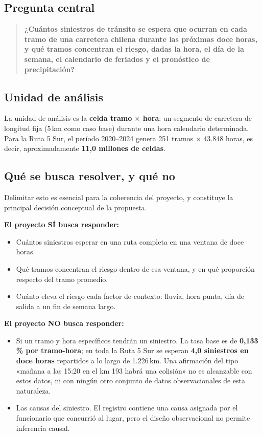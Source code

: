 \documentclass[11pt,a4paper]{article}
\begin{document}
\subsection{Pregunta central}

\begin{quote}
\textbf{¿Cuántos siniestros de tránsito se espera que ocurran en cada tramo de
una carretera chilena durante las próximas doce horas, y qué tramos concentran
el riesgo, dadas la hora, el día de la semana, el calendario de feriados y el
pronóstico de precipitación?}
\end{quote}

\subsection{Unidad de análisis}

La unidad de análisis es la \textbf{celda tramo $\times$ hora}: un segmento de
carretera de longitud fija (5\,km como caso base) durante una hora calendario
determinada. Para la Ruta 5 Sur, el período 2020--2024 genera 251 tramos
$\times$ 43.848 horas, es decir, aproximadamente \textbf{11,0 millones de
celdas}.

\subsection{Qué se busca resolver, y qué no}

Delimitar esto es esencial para la coherencia del proyecto, y constituye la
principal decisión conceptual de la propuesta.

\medskip
\noindent\textbf{El proyecto SÍ busca responder:}
\begin{itemize}
  \item Cuántos siniestros esperar en una ruta completa en una ventana de doce
  horas.
  \item Qué tramos concentran el riesgo dentro de esa ventana, y en qué
  proporción respecto del tramo promedio.
  \item Cuánto eleva el riesgo cada factor de contexto: lluvia, hora punta, día
  de salida a un fin de semana largo.
\end{itemize}

\medskip
\noindent\textbf{El proyecto NO busca responder:}
\begin{itemize}
  \item Si un tramo y hora específicos tendrán un siniestro. La tasa base es de
  \textbf{0,133\,\% por tramo-hora}; en toda la Ruta 5 Sur se esperan
  \textbf{4,0 siniestros en doce horas} repartidos a lo largo de 1.226\,km. Una
  afirmación del tipo «mañana a las 15:20 en el km 193 habrá una colisión» no es
  alcanzable con estos datos, ni con ningún otro conjunto de datos
  observacionales de esta naturaleza.
  \item Las causas del siniestro. El registro contiene una causa asignada por el
  funcionario que concurrió al lugar, pero el diseño observacional no permite
  inferencia causal.
\end{itemize}
\end{document}
